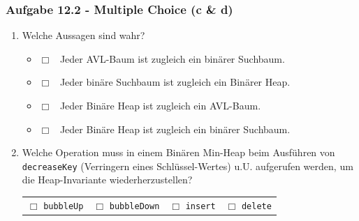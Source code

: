 \documentclass{beamer}
\begin{document}
\begin{frame}[t]
	\frametitle{Aufgabe 12.2 - Multiple Choice (c \& d)}
	\small
	\begin{enumerate}[label=\textcolor{black}{\alph*)},align=left,leftmargin=*,itemsep=2em,start=3]
		\item Welche Aussagen sind wahr? \medskip \\
		      \begin{itemize}[label={}]
			      \item $\Box$ \, Jeder AVL-Baum ist zugleich ein binärer Suchbaum.
			      \item $\Box$ \, Jeder binäre Suchbaum ist zugleich ein Binärer Heap.
			      \item $\Box$ \, Jeder Binäre Heap ist zugleich ein AVL-Baum.
			      \item $\Box$ \, Jeder Binäre Heap ist zugleich ein binärer Suchbaum.
		      \end{itemize}
		\item Welche Operation muss in einem Binären Min-Heap beim Ausführen von \lstinline{decreaseKey}
		      (Verringern eines Schlüssel-Wertes) u.U. aufgerufen werden, um die Heap-Invariante wiederherzustellen? \medskip \\
		      \begin{tabular}{llll}
			      $\Box$ \lstinline{bubbleUp}   &
			      $\Box$ \lstinline{bubbleDown} &
			      $\Box$ \lstinline{insert}     &
			      $\Box$ \lstinline{delete}
		      \end{tabular}
	\end{enumerate}
\end{frame}
\end{document}

